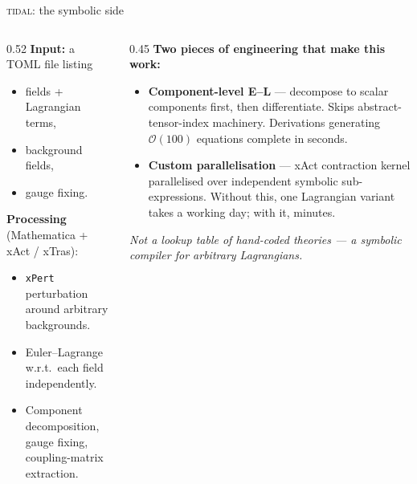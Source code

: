 \begin{frame}{\textsc{tidal}: the symbolic side}
  \begin{columns}[T,onlytextwidth]
    \begin{column}{0.52\textwidth}
      \textbf{Input:} a TOML file listing
      \begin{itemize}\scriptsize
        \item fields + Lagrangian terms,
        \item background fields,
        \item gauge fixing.
      \end{itemize}
      \vspace{0.2em}
      \textbf{Processing} (Mathematica + xAct / xTras):
      \begin{itemize}\scriptsize
        \item \texttt{xPert} perturbation around arbitrary backgrounds.
        \item Euler--Lagrange w.r.t.\ each field independently.
        \item Component decomposition, gauge fixing, coupling-matrix extraction.
      \end{itemize}
    \end{column}
    \begin{column}{0.45\textwidth}
      \textbf{Two pieces of engineering that make this work:}
      \begin{itemize}\scriptsize
        \item \textbf{Component-level E--L} --- decompose to scalar components first, then differentiate. Skips abstract-tensor-index machinery. Derivations generating $\mathcal{O}(100)$ equations complete in seconds.
        \item \textbf{Custom parallelisation} --- xAct contraction kernel parallelised over independent symbolic sub-expressions. Without this, one Lagrangian variant takes a working day; with it, minutes.
      \end{itemize}
      \vspace{0.3em}
      \emph{Not a lookup table of hand-coded theories --- a symbolic compiler for arbitrary Lagrangians.}
    \end{column}
  \end{columns}
\end{frame}
